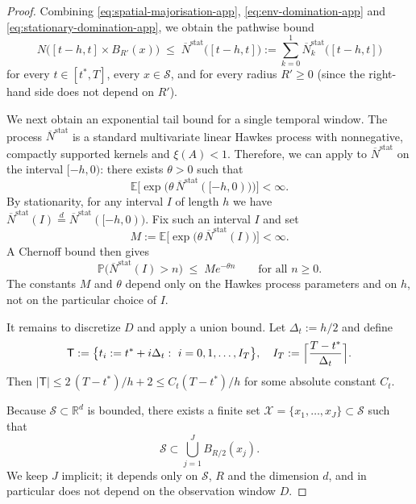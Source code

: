 \documentclass{statsoc}
\newcommand{\bbE}{\mathbb{E}}
\newcommand{\bbP}{\mathbb{P}}
\newcommand{\bbR}{\mathbb{R}}
\newcommand{\1}{\mathbbm{1}}
\begin{document}
\begin{proof}
Combining \eqref{eq:spatial-majorisation-app},
\eqref{eq:env-domination-app} and \eqref{eq:stationary-domination-app}, we obtain
the pathwise bound
\begin{equation}\label{eq:window-domination-app}
  N\bigl([t-h,t]\times B_{R'}(x)\bigr)
  \;\le\; \overline N^{\mathrm{stat}}\bigl([t-h,t]\bigr)
  := \sum_{k=0}^1 \overline N^{\mathrm{stat}}_k\bigl([t-h,t]\bigr)
\end{equation}
for every $t\in[t^\ast,T]$, every $x\in\mathcal{S}$, and for every radius $R'\ge 0$
(since the right-hand side does not depend on $R'$).

We next obtain an exponential tail bound for a single temporal window. The process $\overline N^{\mathrm{stat}}$ is a standard multivariate linear Hawkes process with nonnegative, compactly supported kernels and $\xi(A)<1$.  Therefore, we can apply \cite[Proposition~2]{hansen2015lasso} to $\overline N^{\mathrm{stat}}$ on the interval $[-h,0)$: there exists $\theta>0$ such that
\[
  \bbE\bigl[\exp\bigl( \theta\,\overline N^{\mathrm{stat}}([-h,0))\bigr)\bigr]
  < \infty.
\]
By stationarity, for any interval $I$ of length $h$ we have
\(
  \overline N^{\mathrm{stat}}(I)
  \stackrel{d}{=} \overline N^{\mathrm{stat}}([-h,0)).
\)
Fix such an interval $I$ and set
\[
  M := \bbE\bigl[\exp\bigl( \theta\,\overline N^{\mathrm{stat}}(I)\bigr)\bigr]
  < \infty.
\]
A Chernoff bound then gives
\begin{equation}\label{eq:single-window-tail-app}
  \bbP\bigl( \overline N^{\mathrm{stat}}(I) > n \bigr)
  \;\le\; M e^{-\theta n}
  \qquad\text{for all }n\ge 0.
\end{equation}
The constants $M$ and $\theta$ depend only on the Hawkes process parameters and on
$h$, not on the particular choice of $I$.

It remains to discretize $D$ and apply a union bound. Let $\Delta_t:=h/2$ and define
\[
  \mathsf{T}
  := \bigl\{t_i:=t^\ast+i\Delta_t:\ i=0,1,\dots,I_T\bigr\},
  \quad
  I_T:=\Bigl\lceil\frac{T-t^\ast}{\Delta_t}\Bigr\rceil.
\]
Then
\(
  |\mathsf{T}|
  \le 2\,(T-t^\ast)/h + 2
  \le C_t (T-t^\ast)/h
\)
for some absolute constant $C_t$.

Because $\mathcal{S}\subset\bbR^d$ is bounded, there exists a finite set $\mathcal X=\{x_1,\dots,x_J\}\subset\mathcal{S}$ such that
\[
  \mathcal{S} \subset \bigcup_{j=1}^J B_{R/2}(x_j).
\]
We keep $J$ implicit; it depends only on $\mathcal{S}$, $R$ and the dimension $d$, and in particular does not depend on the observation window $D$.


\end{proof}
\end{document}
